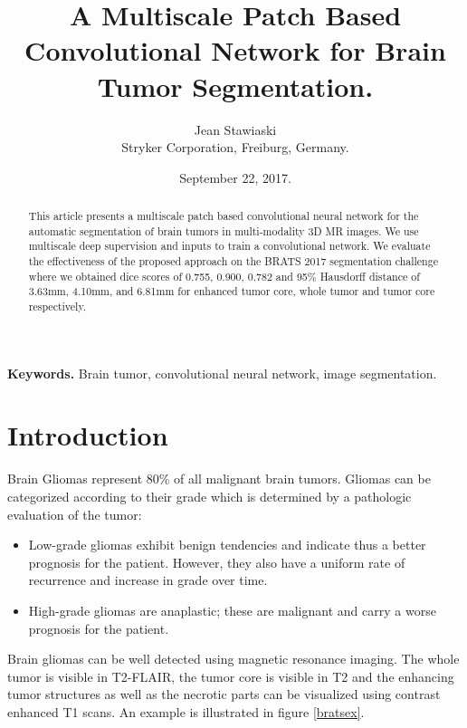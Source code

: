 \documentclass[11pt]{article}
\begin{document}
\title{A Multiscale Patch Based Convolutional Network for Brain Tumor Segmentation. }

\author{Jean Stawiaski\\ \small Stryker Corporation, Freiburg, Germany.}

\date{September 22, 2017.}

\maketitle

\begin{abstract}
  This article presents a multiscale patch based convolutional neural network for the automatic segmentation of brain tumors in multi-modality 3D MR images. We use multiscale deep supervision and inputs to train a convolutional network. We evaluate the effectiveness of the proposed approach on the BRATS 2017 segmentation challenge \cite{brats1,brats2,brats3,brats4} where we obtained dice scores of 0.755, 0.900, 0.782 and 95\% Hausdorff distance of 3.63mm, 4.10mm, and 6.81mm  for enhanced tumor core, whole tumor and tumor core respectively.
\end{abstract}

\smallskip
\noindent \textbf{Keywords.} Brain tumor, convolutional neural network, image segmentation.

\section{Introduction}

Brain Gliomas represent 80\% of all malignant brain tumors. Gliomas can be categorized according to their grade which is determined by a pathologic evaluation of the tumor:
\begin{itemize}
\item Low-grade gliomas exhibit benign tendencies and indicate thus a better prognosis for the patient. However, they also have a uniform rate of recurrence and increase in grade over time.
\item High-grade gliomas are anaplastic; these are malignant and carry a worse prognosis for the patient.
\end{itemize}

Brain gliomas can be well detected using magnetic resonance imaging. The whole tumor is visible in T2-FLAIR, the tumor core is visible in T2 and the enhancing tumor structures as well as the necrotic parts can be visualized using contrast enhanced T1 scans. An example is illustrated in figure \ref{bratsex}. \\
\end{document}
